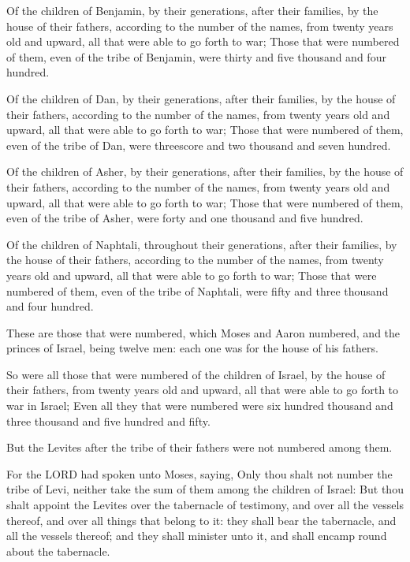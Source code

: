 \Verse Of the children of Benjamin, by their generations, after their
families, by the house of their fathers, according to the number of
the names, from twenty years old and upward, all that were able to go
forth to war; \Verse Those that were numbered of them, even of the tribe
of Benjamin, were thirty and five thousand and four hundred.

\Verse Of the children of Dan, by their generations, after their
families, by the house of their fathers, according to the number of
the names, from twenty years old and upward, all that were able to go
forth to war; \Verse Those that were numbered of them, even of the tribe
of Dan, were threescore and two thousand and seven hundred.

\Verse Of the children of Asher, by their generations, after their
families, by the house of their fathers, according to the number of
the names, from twenty years old and upward, all that were able to go
forth to war; \Verse Those that were numbered of them, even of the tribe
of Asher, were forty and one thousand and five hundred.

\Verse Of the children of Naphtali, throughout their generations, after
their families, by the house of their fathers, according to the number
of the names, from twenty years old and upward, all that were able to
go forth to war; \Verse Those that were numbered of them, even of the
tribe of Naphtali, were fifty and three thousand and four hundred.

\Verse These are those that were numbered, which Moses and Aaron
numbered, and the princes of Israel, being twelve men: each one was
for the house of his fathers.

\Verse So were all those that were numbered of the children of Israel,
by the house of their fathers, from twenty years old and upward, all
that were able to go forth to war in Israel; \Verse Even all they that
were numbered were six hundred thousand and three thousand and five
hundred and fifty.

\Verse But the Levites after the tribe of their fathers were not
numbered among them.

\Verse For the LORD had spoken unto Moses, saying, \Verse Only thou shalt
not number the tribe of Levi, neither take the sum of them among the
children of Israel: \Verse But thou shalt appoint the Levites over the
tabernacle of testimony, and over all the vessels thereof, and over
all things that belong to it: they shall bear the tabernacle, and all
the vessels thereof; and they shall minister unto it, and shall encamp
round about the tabernacle.

